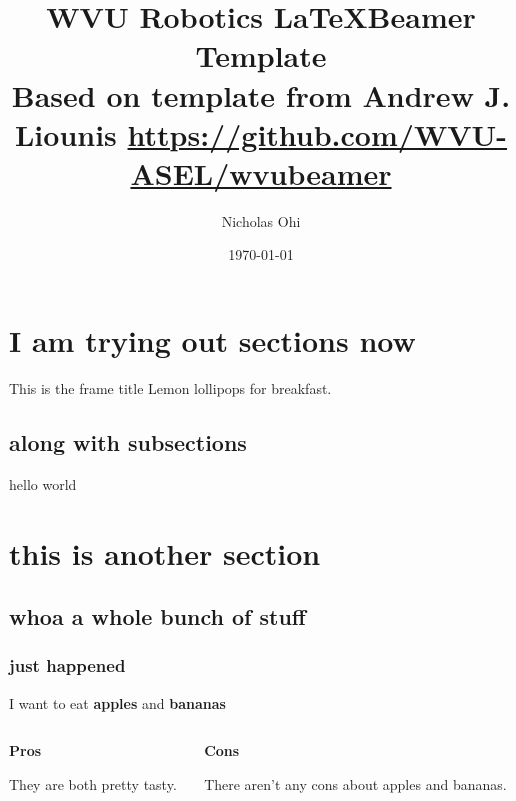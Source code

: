 \documentclass[xcolor=table]{beamer}
\title{WVU Robotics \LaTeX Beamer Template \\ \small{Based on template from Andrew J. Liounis \url{https://github.com/WVU-ASEL/wvubeamer}}}
\date{\today}
\author{Nicholas Ohi}
\begin{document}
\begin{frame}
    \titlepage
\end{frame}

\begin{frame}[t]
    \frametitle{{\bfseries\toctitle}}
    \tableofcontents
\end{frame}

\section{I am trying out sections now}

\begin{frame}{This is the frame title}
    Lemon lollipops for breakfast.
\end{frame}

\subsection{along with subsections}
\begin{frame}[plain]
    hello world
\end{frame}

\section{this is another section}
\subsection{whoa a whole bunch of stuff}
\subsubsection{just happened}

\begin{frame}{I want to eat \textbf{apples} and \textbf{bananas}}
    \begin{columns}
        \centering
        \begin{column}[t]{0.47\textwidth}
            \centering
            \textbf{Pros}

            They are both pretty tasty.
        \end{column}
        \begin{column}[t]{0.47\textwidth}
            \centering
            \textbf{Cons}

            There aren't any cons about apples and bananas.
        \end{column}
    \end{columns}
\end{frame}
\end{document}
